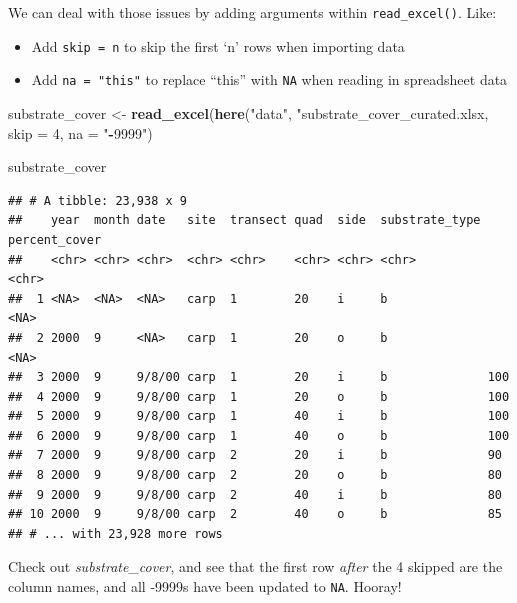 \documentclass[]{book}
\newenvironment{Shaded}{\begin{snugshade}}{\end{snugshade}}
\newcommand{\DecValTok}[1]{\textcolor[rgb]{0.00,0.00,0.81}{#1}}
\newcommand{\KeywordTok}[1]{\textcolor[rgb]{0.13,0.29,0.53}{\textbf{#1}}}
\newcommand{\NormalTok}[1]{#1}
\newcommand{\OperatorTok}[1]{\textcolor[rgb]{0.81,0.36,0.00}{\textbf{#1}}}
\newcommand{\StringTok}[1]{\textcolor[rgb]{0.31,0.60,0.02}{#1}}
\providecommand{\tightlist}{%
  \setlength{\itemsep}{0pt}\setlength{\parskip}{0pt}}
\begin{document}
We can deal with those issues by adding arguments within \texttt{read\_excel()}. Like:

\begin{itemize}
\tightlist
\item
  Add \texttt{skip\ =\ n} to skip the first `n' rows when importing data
\item
  Add \texttt{na\ =\ "this"} to replace ``this'' with \texttt{NA} when reading in spreadsheet data
\end{itemize}

\begin{Shaded}
\begin{Highlighting}[]
\NormalTok{substrate_cover <-}\StringTok{ }\KeywordTok{read_excel}\NormalTok{(}\KeywordTok{here}\NormalTok{(}\StringTok{"data"}\NormalTok{, }\StringTok{"substrate_cover_curated.xlsx, skip = 4, na = "}\OperatorTok{-}\DecValTok{9999}\StringTok{")}
\end{Highlighting}
\end{Shaded}

\begin{Shaded}
\begin{Highlighting}[]
\NormalTok{substrate_cover}
\end{Highlighting}
\end{Shaded}

\begin{verbatim}
## # A tibble: 23,938 x 9
##    year  month date   site  transect quad  side  substrate_type percent_cover
##    <chr> <chr> <chr>  <chr> <chr>    <chr> <chr> <chr>          <chr>        
##  1 <NA>  <NA>  <NA>   carp  1        20    i     b              <NA>         
##  2 2000  9     <NA>   carp  1        20    o     b              <NA>         
##  3 2000  9     9/8/00 carp  1        20    i     b              100          
##  4 2000  9     9/8/00 carp  1        20    o     b              100          
##  5 2000  9     9/8/00 carp  1        40    i     b              100          
##  6 2000  9     9/8/00 carp  1        40    o     b              100          
##  7 2000  9     9/8/00 carp  2        20    i     b              90           
##  8 2000  9     9/8/00 carp  2        20    o     b              80           
##  9 2000  9     9/8/00 carp  2        40    i     b              80           
## 10 2000  9     9/8/00 carp  2        40    o     b              85           
## # ... with 23,928 more rows
\end{verbatim}

Check out \emph{substrate\_cover}, and see that the first row \emph{after} the 4 skipped are the column names, and all -9999s have been updated to \texttt{NA}. Hooray!
\end{document}
